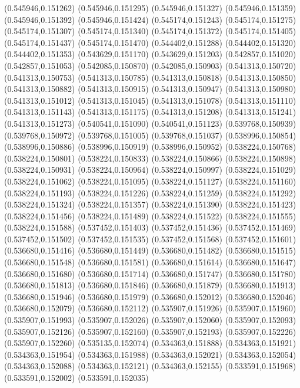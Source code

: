 (0.545946,0.151262)
(0.545946,0.151295)
(0.545946,0.151327)
(0.545946,0.151359)
(0.545946,0.151392)
(0.545946,0.151424)
(0.545174,0.151243)
(0.545174,0.151275)
(0.545174,0.151307)
(0.545174,0.151340)
(0.545174,0.151372)
(0.545174,0.151405)
(0.545174,0.151437)
(0.545174,0.151470)
(0.544402,0.151288)
(0.544402,0.151320)
(0.544402,0.151353)
(0.543629,0.151170)
(0.543629,0.151203)
(0.542857,0.151020)
(0.542857,0.151053)
(0.542085,0.150870)
(0.542085,0.150903)
(0.541313,0.150720)
(0.541313,0.150753)
(0.541313,0.150785)
(0.541313,0.150818)
(0.541313,0.150850)
(0.541313,0.150882)
(0.541313,0.150915)
(0.541313,0.150947)
(0.541313,0.150980)
(0.541313,0.151012)
(0.541313,0.151045)
(0.541313,0.151078)
(0.541313,0.151110)
(0.541313,0.151143)
(0.541313,0.151175)
(0.541313,0.151208)
(0.541313,0.151241)
(0.541313,0.151273)
(0.540541,0.151090)
(0.540541,0.151123)
(0.539768,0.150939)
(0.539768,0.150972)
(0.539768,0.151005)
(0.539768,0.151037)
(0.538996,0.150854)
(0.538996,0.150886)
(0.538996,0.150919)
(0.538996,0.150952)
(0.538224,0.150768)
(0.538224,0.150801)
(0.538224,0.150833)
(0.538224,0.150866)
(0.538224,0.150898)
(0.538224,0.150931)
(0.538224,0.150964)
(0.538224,0.150997)
(0.538224,0.151029)
(0.538224,0.151062)
(0.538224,0.151095)
(0.538224,0.151127)
(0.538224,0.151160)
(0.538224,0.151193)
(0.538224,0.151226)
(0.538224,0.151259)
(0.538224,0.151292)
(0.538224,0.151324)
(0.538224,0.151357)
(0.538224,0.151390)
(0.538224,0.151423)
(0.538224,0.151456)
(0.538224,0.151489)
(0.538224,0.151522)
(0.538224,0.151555)
(0.538224,0.151588)
(0.537452,0.151403)
(0.537452,0.151436)
(0.537452,0.151469)
(0.537452,0.151502)
(0.537452,0.151535)
(0.537452,0.151568)
(0.537452,0.151601)
(0.536680,0.151416)
(0.536680,0.151449)
(0.536680,0.151482)
(0.536680,0.151515)
(0.536680,0.151548)
(0.536680,0.151581)
(0.536680,0.151614)
(0.536680,0.151647)
(0.536680,0.151680)
(0.536680,0.151714)
(0.536680,0.151747)
(0.536680,0.151780)
(0.536680,0.151813)
(0.536680,0.151846)
(0.536680,0.151879)
(0.536680,0.151913)
(0.536680,0.151946)
(0.536680,0.151979)
(0.536680,0.152012)
(0.536680,0.152046)
(0.536680,0.152079)
(0.536680,0.152112)
(0.535907,0.151926)
(0.535907,0.151960)
(0.535907,0.151993)
(0.535907,0.152026)
(0.535907,0.152060)
(0.535907,0.152093)
(0.535907,0.152126)
(0.535907,0.152160)
(0.535907,0.152193)
(0.535907,0.152226)
(0.535907,0.152260)
(0.535135,0.152074)
(0.534363,0.151888)
(0.534363,0.151921)
(0.534363,0.151954)
(0.534363,0.151988)
(0.534363,0.152021)
(0.534363,0.152054)
(0.534363,0.152088)
(0.534363,0.152121)
(0.534363,0.152155)
(0.533591,0.151968)
(0.533591,0.152002)
(0.533591,0.152035)
